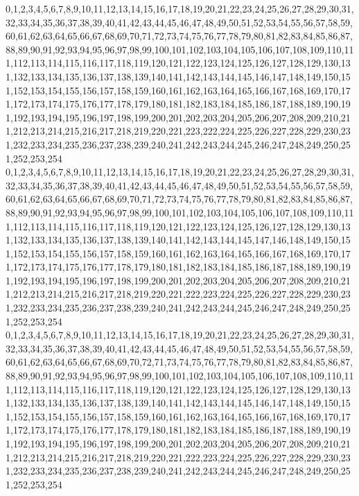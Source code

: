 \documentclass[12pt]{article}
\begin{document}
{0,1,2,3,4,5,6,7,8,9,10,11,12,13,14,15,16,17,18,19,20,21,22,23,24,25,26,27,28,29,30,31,32,33,34,35,36,37,38,39,40,41,42,43,44,45,46,47,48,49,50,51,52,53,54,55,56,57,58,59,60,61,62,63,64,65,66,67,68,69,70,71,72,73,74,75,76,77,78,79,80,81,82,83,84,85,86,87,88,89,90,91,92,93,94,95,96,97,98,99,100,101,102,103,104,105,106,107,108,109,110,111,112,113,114,115,116,117,118,119,120,121,122,123,124,125,126,127,128,129,130,131,132,133,134,135,136,137,138,139,140,141,142,143,144,145,146,147,148,149,150,151,152,153,154,155,156,157,158,159,160,161,162,163,164,165,166,167,168,169,170,171,172,173,174,175,176,177,178,179,180,181,182,183,184,185,186,187,188,189,190,191,192,193,194,195,196,197,198,199,200,201,202,203,204,205,206,207,208,209,210,211,212,213,214,215,216,217,218,219,220,221,223,222,224,225,226,227,228,229,230,231,232,233,234,235,236,237,238,239,240,241,242,243,244,245,246,247,248,249,250,251,252,253,254\\
0,1,2,3,4,5,6,7,8,9,10,11,12,13,14,15,16,17,18,19,20,21,22,23,24,25,26,27,28,29,30,31,32,33,34,35,36,37,38,39,40,41,42,43,44,45,46,47,48,49,50,51,52,53,54,55,56,57,58,59,60,61,62,63,64,65,66,67,68,69,70,71,72,73,74,75,76,77,78,79,80,81,82,83,84,85,86,87,88,89,90,91,92,93,94,95,96,97,98,99,100,101,102,103,104,105,106,107,108,109,110,111,112,113,114,115,116,117,118,119,120,121,122,123,124,125,126,127,128,129,130,131,132,133,134,135,136,137,138,139,140,141,142,143,144,145,147,146,148,149,150,151,152,153,154,155,156,157,158,159,160,161,162,163,164,165,166,167,168,169,170,171,172,173,174,175,176,177,178,179,180,181,182,183,184,185,186,187,188,189,190,191,192,193,194,195,196,197,198,199,200,201,202,203,204,205,206,207,208,209,210,211,212,213,214,215,216,217,218,219,220,221,222,223,224,225,226,227,228,229,230,231,232,233,234,235,236,237,238,239,240,241,242,243,244,245,246,247,248,249,250,251,252,253,254\\
0,1,2,3,4,5,6,7,8,9,10,11,12,13,14,15,16,17,18,19,20,21,22,23,24,25,26,27,28,29,30,31,32,33,34,35,36,37,38,39,40,41,42,43,44,45,46,47,48,49,50,51,52,53,54,55,56,57,58,59,60,61,62,63,64,65,66,67,68,69,70,72,71,73,74,75,76,77,78,79,80,81,82,83,84,85,86,87,88,89,90,91,92,93,94,95,96,97,98,99,100,101,102,103,104,105,106,107,108,109,110,111,112,113,114,115,116,117,118,119,120,121,122,123,124,125,126,127,128,129,130,131,132,133,134,135,136,137,138,139,140,141,142,143,144,145,146,147,148,149,150,151,152,153,154,155,156,157,158,159,160,161,162,163,164,165,166,167,168,169,170,171,172,173,174,175,176,177,178,179,180,181,182,183,184,185,186,187,188,189,190,191,192,193,194,195,196,197,198,199,200,201,202,203,204,205,206,207,208,209,210,211,212,213,214,215,216,217,218,219,220,221,222,223,224,225,226,227,228,229,230,231,232,233,234,235,236,237,238,239,240,241,242,243,244,245,246,247,248,249,250,251,252,253,254\\
}
\end{document}
